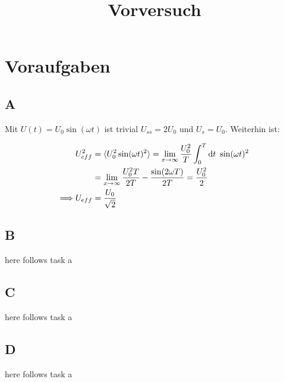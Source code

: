 

\title{Vorversuch}


\maketitle
\tableofcontents
\disclaimer

\chapter{Voraufgaben}
\section*{A}
Mit $U(t) = U_0 \sin(\omega t)$ ist trivial $U_{ss} = 2 U_0$ und $U_s = U_0$.
Weiterhin ist:

\begin{align}
	U_{eff}^2 &= \langle U_0^2 \sin(\omega t)^2 \rangle = \lim_{x\to\infty} \frac{U_0^2}{T} \int_0^T \text{d}t\text{ } \sin(\omega t)^2\\
	&= \lim_{x\to\infty} \frac{U_0^2 T}{2 T} - \frac{\sin(2 \omega T)}{2 T} = \frac{U_0^2}{2}\\
	\Longrightarrow U_{eff} &= \frac{U_0}{\sqrt{2}}
\end{align}

\section*{B}
here follows task a
\section*{C}
here follows task a
\section*{D}
here follows task a

